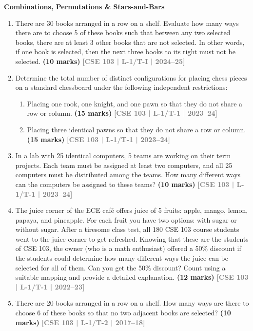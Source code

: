\documentclass[12pt,a3paper]{article}
\newcommand{\yr}[1]{\hfill\textcolor{gray}{\small\textbf{[#1]}}}
\newcommand{\mk}[1]{\textcolor{orange!70!black}{\small\textbf{(#1 marks)}}}
\newcommand{\subtopic}[2]{%
  \vspace{10pt}
  \noindent\begin{tcolorbox}[colback=#1!8,colframe=#1,boxrule=0.6pt,arc=4pt,
    left=6pt,right=6pt,top=4pt,bottom=4pt]
    \small\bfseries\textcolor{#1}{#2}
  \end{tcolorbox}
  \vspace{2pt}
}
\begin{document}
\subtopic{cC}{Combinations, Permutations \& Stars-and-Bars}
\label{sub:s6-combinations}

\begin{enumerate}

\item There are 30 books arranged in a row on a shelf. Evaluate how many ways there are to choose 5 of these books such that between any two selected books, there are at least 3 other books that are not selected. In other words, if one book is selected, then the next three books to its right must not be selected.
\mk{10} \yr{CSE 103 | L-1/T-I | 2024--25}  

\item Determine the total number of distinct configurations for placing chess pieces on a standard chessboard under the following independent restrictions:
\begin{enumerate}
  \item Placing one rook, one knight, and one pawn so that they do not share a row or column. \mk{15} \yr{CSE 103 | L-1/T-1 | 2023--24}
  \item Placing three identical pawns so that they do not share a row or column. \mk{15} \yr{CSE 103 | L-1/T-1 | 2023--24}
\end{enumerate}

\item In a lab with 25 identical computers, 5 teams are working on their term projects. Each team must be assigned at least two computers, and all 25 computers must be distributed among the teams. How many different ways can the computers be assigned to these teams?
\mk{10} \yr{CSE 103 | L-1/T-1 | 2023--24}

\item The juice corner of the ECE café offers juice of 5 fruits: apple, mango, lemon, papaya, and pineapple. For each fruit you have two options: with sugar or without sugar. After a tiresome class test, all 180 CSE 103 course students went to the juice corner to get refreshed. Knowing that these are the students of CSE 103, the owner (who is a math enthusiast) offered a 50\% discount if the students could determine how many different ways the juice can be selected for all of them. Can you get the 50\% discount? Count using a suitable mapping and provide a detailed explanation.
\mk{12} \yr{CSE 103 | L-1/T-1 | 2022--23}

\item There are 20 books arranged in a row on a shelf. How many ways are there to choose 6 of these books so that no two adjacent books are selected?
\mk{10} \yr{CSE 103 | L-1/T-2 | 2017--18}


\end{enumerate}
\end{document}
